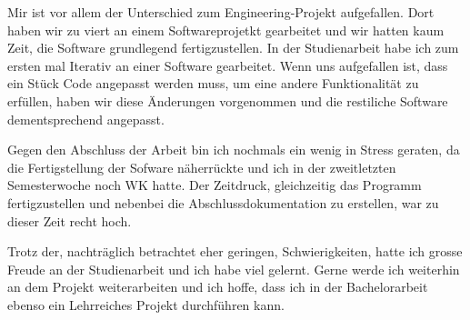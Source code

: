 \documentclass[]{subfiles}
\begin{document}
    Mir ist vor allem der Unterschied zum Engineering-Projekt aufgefallen. Dort haben wir zu 
    viert an einem Softwareprojetkt gearbeitet und wir hatten kaum Zeit, die Software grundlegend
    fertigzustellen. 
    In der Studienarbeit habe ich zum ersten mal Iterativ an einer Software gearbeitet.
    Wenn uns aufgefallen ist, dass ein Stück Code angepasst werden muss, um eine andere Funktionalität
    zu erfüllen, haben wir diese Änderungen vorgenommen und die restiliche Software dementsprechend angepasst.

    Gegen den Abschluss der Arbeit bin ich nochmals ein wenig in Stress geraten, da die Fertigstellung
    der Sofware näherrückte und ich in der zweitletzten Semesterwoche noch WK hatte. 
    Der Zeitdruck, gleichzeitig das Programm fertigzustellen und nebenbei die Abschlussdokumentation
    zu erstellen, war zu dieser Zeit recht hoch. 

    Trotz der, nachträglich betrachtet eher geringen, Schwierigkeiten, hatte ich grosse Freude an
    der Studienarbeit und ich habe viel gelernt. Gerne werde ich weiterhin an dem Projekt 
    weiterarbeiten und ich hoffe, dass ich in der Bachelorarbeit ebenso ein Lehrreiches Projekt
    durchführen kann.
    
\end{document}
